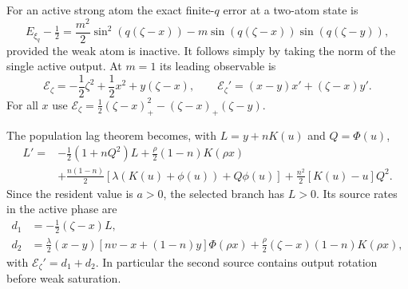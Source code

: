 \documentclass[11pt]{article}
\numberwithin{equation}{section}
\theoremstyle{definition}
\theoremstyle{remark}
\newcommand{\1}{\mathbf 1}
\begin{document}
For an active strong atom the exact finite-$q$ error at a two-atom state is
\begin{equation}\label{pa:atomicexacterror}
 E_{\xi_q}-\tfrac12
 =\frac{m^2}{2}\sin^2(q(\zeta-x))
 -m\sin(q(\zeta-x))\sin(q(\zeta-y)),
\end{equation}
provided the weak atom is inactive. It follows simply by taking the norm
of the single active output. At $m=1$ its leading observable is
\begin{equation}\label{pa:atomicerror}
 \mathcal E_\zeta=-\frac12\zeta^2+\frac12x^2+y(\zeta-x),
 \qquad \mathcal E_\zeta'=(x-y)x'+(\zeta-x)y'.
\end{equation}
For all $x$ use
$\mathcal E_\zeta=\tfrac12(\zeta-x)_+^2-(\zeta-x)_+(\zeta-y)$.

The population lag theorem becomes, with $L=y+nK(u)$ and $Q=\Phi(u)$,
\begin{align}\label{pa:atomiclag}
 L'={}&-\tfrac12(1+nQ^2)L+\tfrac\rho2(1-n)K(\rho x)\nonumber\\
 &+\tfrac{n(1-n)}2[\lambda(K(u)+\phi(u))+Q\phi(u)]
 +\tfrac{n^2}{2}[K(u)-u]Q^2.
\end{align}
Since the resident value is $a>0$, the selected branch has $L>0$. Its
source rates in the active phase are
\begin{align}
 d_1&=-\tfrac12(\zeta-x)L,\label{pa:atomicrates}\\
 d_2&=\tfrac\lambda2(x-y)[nv-x+(1-n)y]\Phi(\rho x)
 +\tfrac\rho2(\zeta-x)(1-n)K(\rho x),\nonumber
\end{align}
with $\mathcal E_\zeta'=d_1+d_2$. In particular the second source contains
output rotation before weak saturation.
\end{document}
